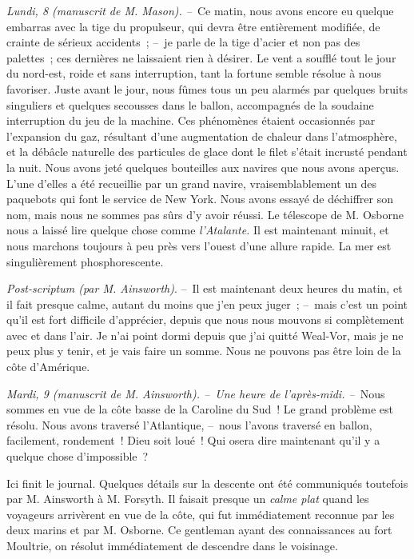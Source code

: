 \documentclass[french,twoside]{book} %
\begin{document}
\emph{Lundi, 8 (manuscrit de M. Mason). –} Ce matin, nous avons encore eu quelque embarras avec la tige du propulseur, qui devra être entièrement modifiée, de crainte de sérieux accidents ; – je parle de la tige d’acier et non pas des palettes ; ces dernières ne laissaient rien à désirer. Le vent a soufflé tout le jour du nord-est, roide et sans interruption, tant la fortune semble résolue à nous favoriser. Juste avant le jour, nous fûmes tous un peu alarmés par quelques bruits singuliers et quelques secousses dans le ballon, accompagnés de la soudaine interruption du jeu de la machine. Ces phénomènes étaient occasionnés par l’expansion du gaz, résultant d’une augmentation de chaleur dans l’atmosphère, et la débâcle naturelle des particules de glace dont le filet s’était incrusté pendant la nuit. Nous avons jeté quelques bouteilles aux navires que nous avons aperçus. L’une d’elles a été recueillie par un grand navire, vraisemblablement un des paquebots qui font le service de New York. Nous avons essayé de déchiffrer son nom, mais nous ne sommes pas sûrs d’y avoir réussi. Le télescope de M. Osborne nous a laissé lire quelque chose comme \emph{l’Atalante.} Il est maintenant minuit, et nous marchons toujours à peu près vers l’ouest d’une allure rapide. La mer est singulièrement phosphorescente.\par
\emph{Post-scriptum (par M. Ainsworth)}. – Il est maintenant deux heures du matin, et il fait presque calme, autant du moins que j’en peux juger ; – mais c’est un point qu’il est fort difficile d’apprécier, depuis que nous nous mouvons si complètement avec et dans l’air. Je n’ai point dormi depuis que j’ai quitté Weal-Vor, mais je ne peux plus y tenir, et je vais faire un somme. Nous ne pouvons pas être loin de la côte d’Amérique.\par
\emph{Mardi, 9 (manuscrit de M. Ainsworth). – Une heure de l’après-midi. –} Nous sommes en vue de la côte basse de la Caroline du Sud ! Le grand problème est résolu. Nous avons traversé l’Atlantique, – nous l’avons traversé en ballon, facilement, rondement ! Dieu soit loué ! Qui osera dire maintenant qu’il y a quelque chose d’impossible ?\par
\bigbreak
\noindent Ici finit le journal. Quelques détails sur la descente ont été communiqués toutefois par M. Ainsworth à M. Forsyth. Il faisait presque un \emph{calme plat} quand les voyageurs arrivèrent en vue de la côte, qui fut immédiatement reconnue par les deux marins et par M. Osborne. Ce gentleman ayant des connaissances au fort Moultrie, on résolut immédiatement de descendre dans le voisinage.\par
\end{document}
